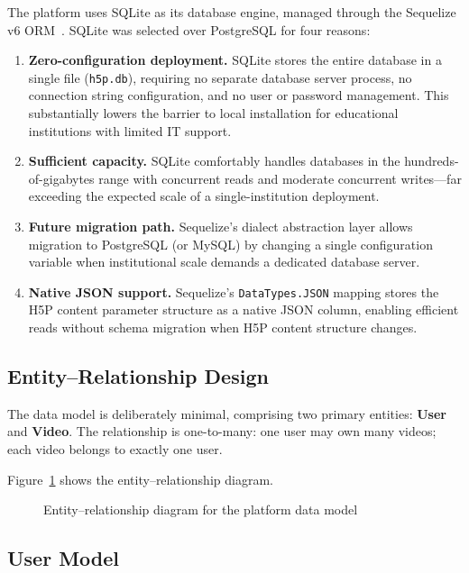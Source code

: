 The platform uses SQLite as its database engine, managed through the
Sequelize v6 ORM~\cite{sqlite2023,sequelize2023}. SQLite was selected
over PostgreSQL for four reasons:

\begin{enumerate}
  \item \textbf{Zero-configuration deployment.} SQLite stores the entire
  database in a single file (\texttt{h5p.db}), requiring no separate
  database server process, no connection string configuration, and no user
  or password management. This substantially lowers the barrier to local
  installation for educational institutions with limited IT support.

  \item \textbf{Sufficient capacity.} SQLite comfortably handles databases
  in the hundreds-of-gigabytes range with concurrent reads and moderate
  concurrent writes---far exceeding the expected scale of a
  single-institution deployment.

  \item \textbf{Future migration path.} Sequelize's dialect abstraction
  layer allows migration to PostgreSQL (or MySQL) by changing a single
  configuration variable when institutional scale demands a dedicated
  database server.

  \item \textbf{Native JSON support.} Sequelize's \texttt{DataTypes.JSON}
  mapping stores the H5P content parameter structure as a native JSON column,
  enabling efficient reads without schema migration when H5P content
  structure changes.
\end{enumerate}

\subsection{Entity--Relationship Design}

The data model is deliberately minimal, comprising two primary entities:
\textbf{User} and \textbf{Video}. The relationship is one-to-many: one user
may own many videos; each video belongs to exactly one user.

Figure~\ref{fig:erd} shows the entity--relationship diagram.

\begin{figure}[H]
  \centering
  
  \caption{Entity--relationship diagram for the platform data model}
  \label{fig:erd}
\end{figure}

\subsection{User Model}

